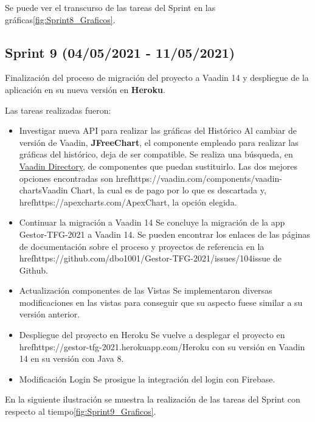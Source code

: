 Se puede ver el transcurso de las tareas del Sprint en las gráficas\ref{fig:Sprint8_Graficos}.



\subsection{Sprint 9 (04/05/2021 - 11/05/2021)}
Finalización del proceso de migración del proyecto a Vaadin 14 y despliegue de la aplicación en su nueva versión en \textbf{Heroku}.

Las tareas realizadas fueron:
\begin{itemize}
	\tightlist
	\item Investigar nueva API para realizar las gráficas del Histórico
		Al cambiar de versión de Vaadin, \textbf{JFreeChart}, el componente empleado para realizar las gráficas del histórico, deja de ser compatible. Se realiza una búsqueda, en \href{https://vaadin.com/directory}{Vaadin Directory}, de componentes que puedan sustituirlo. Las dos mejores opciones encontradas son href{https://vaadin.com/components/vaadin-charts}{Vaadin Chart}, la cual es de pago por lo que es descartada y, href{https://apexcharts.com/}{ApexChart}, la opción elegida.
	\item Continuar la migración a Vaadin 14
		Se concluye la migración de la app Gestor-TFG-2021 a Vaadin 14. Se pueden encontrar los enlaces de las páginas de documentación sobre el proceso y proyectos de referencia en la href{https://github.com/dbo1001/Gestor-TFG-2021/issues/104}{issue de Github}.
	\item Actualización componentes de las Vistas
		Se implementaron diversas modificaciones en las vistas para conseguir que su aspecto fuese similar a su versión anterior.
	\item Despliegue del proyecto en Heroku
		Se vuelve a desplegar el proyecto en href{https://gestor-tfg-2021.herokuapp.com/}{Heroku} con su versión en Vaadin 14 en su versión con Java 8.
	\item Modificación Login
		Se prosigue la integración del login con Firebase.
	
\end{itemize}

En la siguiente ilustración se muestra la realización de las tareas del Sprint con respecto al tiempo\ref{fig:Sprint9_Graficos}.

